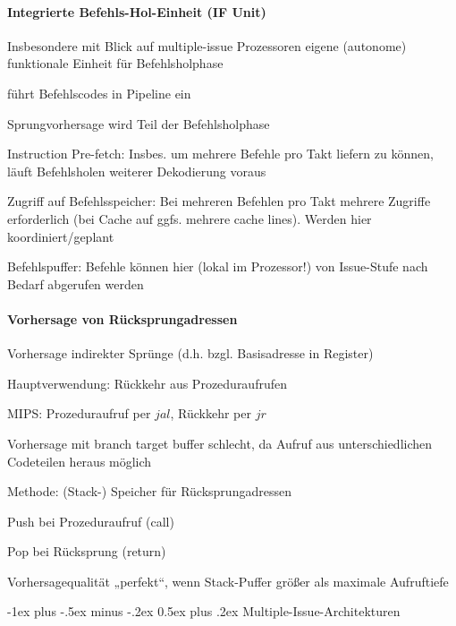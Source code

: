 \documentclass[10pt,landscape]{article}
\makeatletter
\renewcommand{\section}{\@startsection{section}{1}{0mm}%
                                {-1ex plus -.5ex minus -.2ex}%
                                {0.5ex plus .2ex}%
                                {\normalfont\large\bfseries}}
\makeatother
\begin{document}
\begin{multicols}{3}
  \paragraph{Integrierte Befehls-Hol-Einheit (IF Unit)}
  Insbesondere mit Blick auf multiple-issue Prozessoren eigene (autonome) funktionale Einheit für Befehlsholphase
  \begin{itemize*}
    \item führt Befehlscodes in Pipeline ein
    \item Sprungvorhersage wird Teil der Befehlsholphase
    \item Instruction Pre-fetch: Insbes. um mehrere Befehle pro Takt liefern zu können, läuft Befehlsholen weiterer Dekodierung voraus
    \item Zugriff auf Befehlsspeicher: Bei mehreren Befehlen pro Takt mehrere Zugriffe erforderlich (bei Cache auf ggfs. mehrere cache lines). Werden hier koordiniert/geplant
    \item Befehlspuffer: Befehle können hier (lokal im Prozessor!) von Issue-Stufe nach Bedarf abgerufen werden
  \end{itemize*}
  
  \paragraph{Vorhersage von Rücksprungadressen}
  Vorhersage indirekter Sprünge (d.h. bzgl. Basisadresse in Register)
  \begin{itemize*}
    \item Hauptverwendung: Rückkehr aus Prozeduraufrufen
    \item MIPS: Prozeduraufruf per $jal$, Rückkehr per $jr$
    \item Vorhersage mit branch target buffer schlecht, da Aufruf aus unterschiedlichen Codeteilen heraus möglich
    \item Methode: (Stack-) Speicher für Rücksprungadressen
    \item Push bei Prozeduraufruf (call)
    \item Pop bei Rücksprung (return)
    \item Vorhersagequalität „perfekt“, wenn Stack-Puffer größer als maximale Aufruftiefe
  \end{itemize*}
  
  \section{Multiple-Issue-Architekturen}

\end{multicols}
\end{document}
